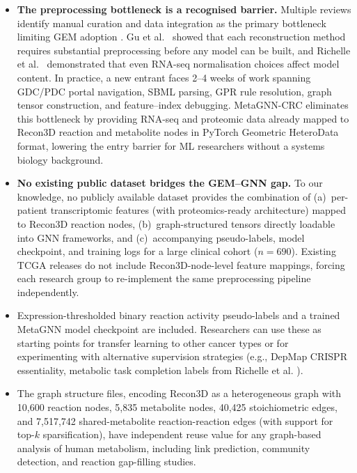 \documentclass[12pt,a4paper]{article}
\begin{document}
\begin{itemize}
\item \textbf{The preprocessing bottleneck is a recognised barrier.} Multiple reviews identify manual curation and data integration as the primary bottleneck limiting GEM adoption \cite{Gu2019,Richelle2019,Opdam2017}. Gu et al.\ \cite{Gu2019} showed that each reconstruction method requires substantial preprocessing before any model can be built, and Richelle et al.\ \cite{Richelle2019} demonstrated that even RNA-seq normalisation choices affect model content. In practice, a new entrant faces 2--4 weeks of work spanning GDC/PDC portal navigation, SBML parsing, GPR rule resolution, graph tensor construction, and feature--index debugging. MetaGNN-CRC eliminates this bottleneck by providing RNA-seq and proteomic data already mapped to Recon3D reaction and metabolite nodes in PyTorch Geometric HeteroData format, lowering the entry barrier for ML researchers without a systems biology background.

\item \textbf{No existing public dataset bridges the GEM--GNN gap.} To our knowledge, no publicly available dataset provides the combination of (a)~per-patient transcriptomic features (with proteomics-ready architecture) mapped to Recon3D reaction nodes, (b)~graph-structured tensors directly loadable into GNN frameworks, and (c)~accompanying pseudo-labels, model checkpoint, and training logs for a large clinical cohort ($n = 690$). Existing TCGA releases do not include Recon3D-node-level feature mappings, forcing each research group to re-implement the same preprocessing pipeline independently.

\item Expression-thresholded binary reaction activity pseudo-labels and a trained MetaGNN model checkpoint are included. Researchers can use these as starting points for transfer learning to other cancer types or for experimenting with alternative supervision strategies (e.g., DepMap CRISPR essentiality, metabolic task completion labels from Richelle et al. \cite{Richelle2019}).

\item The graph structure files, encoding Recon3D as a heterogeneous graph with 10,600 reaction nodes, 5,835 metabolite nodes, 40,425 stoichiometric edges, and 7,517,742 shared-metabolite reaction-reaction edges (with support for top-$k$ sparsification), have independent reuse value for any graph-based analysis of human metabolism, including link prediction, community detection, and reaction gap-filling studies.


\end{itemize}
\end{document}

